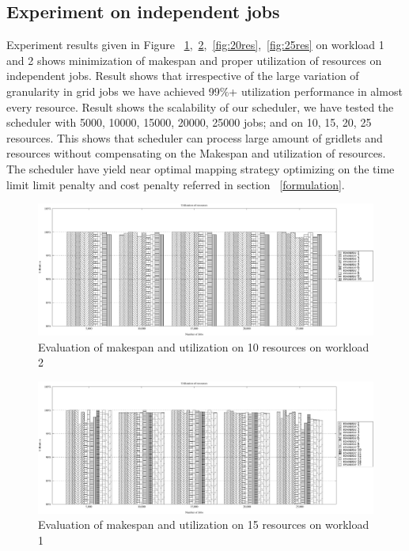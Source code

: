 \subsection{Experiment on independent jobs}
Experiment results given in Figure ~\ref{fig:10res},~\ref{fig:15res},~\ref{fig:20res},~\ref{fig:25res} on workload 1 and 2 shows minimization of makespan and proper utilization of resources on independent jobs. 
Result shows that irrespective of the large variation of granularity in grid jobs we have achieved 99\%+ utilization performance in almost every resource. Result shows the scalability of our scheduler, we have tested the scheduler with 5000, 10000, 15000, 20000, 25000 jobs; and on 10, 15, 20, 25 resources. This shows that scheduler can process large amount of gridlets and resources without compensating on the Makespan and utilization of resources. The scheduler have yield near optimal mapping strategy optimizing on the time limit limit penalty and cost penalty referred in section ~\ref{formulation}.
\begin{figure}[!ht]
    \centering
    \includegraphics[width=1.5\textwidth,keepaspectratio,angle=90]{10res_SHARCNET}
    \caption{Evaluation of makespan and utilization on 10 resources on workload 2}
    \label{fig:10res}
\end{figure}
\begin{figure}[!ht]
    \centering
    \includegraphics[width=1.5\textwidth,keepaspectratio,angle=90]{15res_SHARCNET}
    \caption{Evaluation of makespan and utilization on 15 resources on workload 1}
    \label{fig:15res}
\end{figure}
